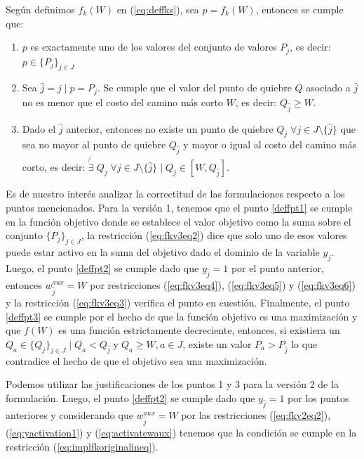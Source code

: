 Según definimos $f_k(W)$ en (\ref{eq:deffks}), sea $p = f_k(W)$, entonces se cumple que:

\begin{enumerate}
  \item {\label{deffpt1} $p$ es exactamente uno de los valores del conjunto de valores $P_j$, es decir: $p \in \{P_j\}_{j \in J}$}
  \item {\label{deffpt2} Sea $\hat{j} = j \;|\; p = P_j$. Se cumple que el valor del punto de quiebre $Q$ asociado a $\hat{j}$ no es menor que el costo del camino más corto $W$, es decir: $Q_{\hat{j}} \geq W$.}
  \item {\label{deffpt3} Dado el $\hat{j}$ anterior, entonces no existe un punto de quiebre $Q_j \; \forall j \in J\setminus\{\hat{j}\}$ que sea no mayor al punto de quiebre $Q_{\hat{j}}$ y mayor o igual al costo del camino más corto, es decir: $\not{\exists}\; Q_j\; \forall j \in J\setminus\{\hat{j}\} \;|\; Q_j \in  [W, Q_{\hat{j}}]$}.
\end{enumerate}

Es de nuestro interés analizar la correctitud de las formulaciones respecto a los puntos mencionados. Para la versión 1, tenemos que el punto \ref{deffpt1} se cumple en la función objetivo donde se establece el valor objetivo como la suma sobre el conjunto $\{P_j\}_{j \in J}$, la restricción (\ref{eq:fkv3eq2}) dice que solo uno de esos valores puede estar activo en la suma del objetivo dado el dominio de la variable $y_j$. Luego, el punto \ref{deffpt2} se cumple dado que $y_{\hat{j}} = 1$ por el punto anterior, entonces $w_{\hat{j}}^{aux} = W$ por restricciones (\ref{eq:fkv3eq4}), (\ref{eq:fkv3eq5}) y (\ref{eq:fkv3eq6}) y la restricción (\ref{eq:fkv3eq3}) verifica el punto en cuestión. Finalmente, el punto \ref{deffpt3} se cumple por el hecho de que la función objetivo es una maximización y que $f(W)$ es una función estrictamente decreciente, entonces, si existiera un $Q_a \in \{Q_j\}_{j \in J} \;|\; Q_a < Q_{\hat{j}} \;\text{y}\; Q_a \geq W, a \in J$, existe un valor $P_a > P_{\hat{j}}$ lo que contradice el hecho de que el objetivo sea una maximización.

Podemos utilizar las justificaciones de los puntos 1 y 3 para la versión 2 de la formulación. Luego, el punto \ref{deffpt2} se cumple dado que $y_{\hat{j}} = 1$ por los puntos anteriores y considerando que $w^{aux}_{\hat{j}} = W$ por las restricciones (\ref{eq:fkv2eq2}), (\ref{eq:yactivation1}) y (\ref{eq:activatewaux}) tenemos que la condición se cumple en la restricción (\ref{eq:implfkoriginalineq}).

